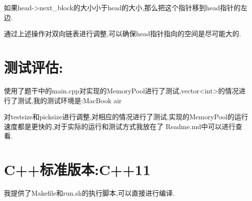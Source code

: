 \documentclass{article}
\begin{document}
如果head->next\_block的大小小于head的大小,那么把这个指针移到head指针的左边.

通过上述操作对双向链表进行调整,可以确保head指针指向的空间是尽可能大的.

\section*{测试评估:}
使用了题干中的main.cpp对实现的MemoryPool进行了测试,vector<int>的情况进行了测试,我的测试环境是:MacBook air 

对testsize和picksize进行调整,对相应的情况进行了测试,实现的MemoryPool的运行速度都是更快的,对于实际的运行和测试方式我放在了
Readme.md中可以进行查看.


\section*{C++标准版本:C++11}
我提供了Makefile和run.sh的执行脚本,可以直接进行编译.
\end{document}
